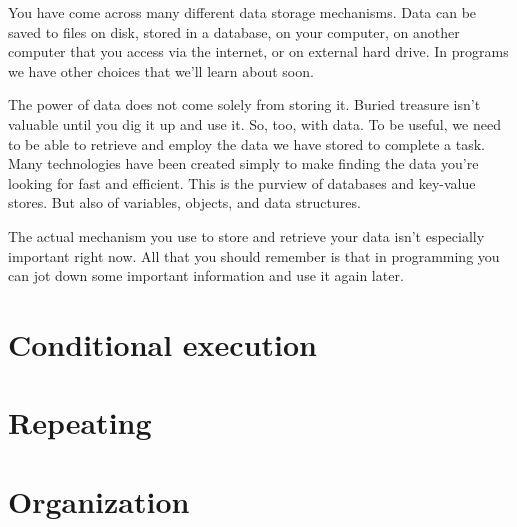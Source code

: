 You have come across many different data storage mechanisms. Data can be saved to files on disk, stored in a database, on your computer, on another computer that you access via the internet, or on external hard drive. In programs we have other choices that we'll learn about soon.

The power of data does not come solely from storing it. Buried treasure isn't valuable until you dig it up and use it. So, too, with data. To be useful, we need to be able to retrieve and employ the data we have stored to complete a task. Many technologies have been created simply to make finding the data you're looking for fast and efficient. This is the purview of databases and key-value stores. But also of variables, objects, and data structures.

The actual mechanism you use to store and retrieve your data isn't especially important right now. All that you should remember is that in programming you can jot down some important information and use it again later.

\section{Conditional execution}
\section{Repeating}
\section{Organization}
